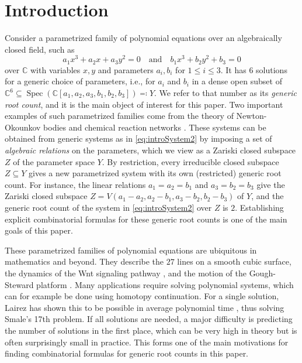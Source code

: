 \documentclass[12pt,reqno,a4paper]{amsart}
\theoremstyle{theoremstyle}
\theoremstyle{examplestyle}
\theoremstyle{algorithmstyle}
\newcommand{\CC}{\mathbb{C}}
\DeclareMathOperator{\Spec}{Spec}
\begin{document}
%

%
\section{Introduction}\label{sec:Introduction}
Consider a parametrized family of polynomial equations over an algebraically closed field, such as
\begin{equation}
  \label{eq:introSystem2}
  a_{1} x^3 +a_{2}x+ a_{3} y^2 = 0 \quad\text{and}\quad b_{1} x^3+b_{2} y^2+b_{3}=0
\end{equation}
over $\CC$ with variables $x,y$ and parameters $a_{i},b_{i}$ for $1\leq{i}\leq{3}$. It has $6$ solutions for a generic choice of parameters, i.e., for $a_{i}$ and $b_{i}$ in a dense open subset of $\mathbb{C}^{6}\subseteq \Spec(\mathbb{C}[a_{1},a_{2},a_{3},b_{1},b_{2},b_{3}])\eqqcolon Y$.  We refer to that number as its \emph{generic root count}, and it is the main object of interest for this paper. Two important examples of such parametrized families come from the theory of Newton-Okounkov bodies \cite{KavehKhovanskii2010,KavehKhovanskii2012} and chemical reaction networks \cite{Dickenstein16}. These systems can be obtained from generic systems as in \cref{eq:introSystem2} by imposing a set of \emph{algebraic relations} on the parameters, which we view as a Zariski closed subspace $Z$ of the parameter space $Y$. By restriction, every irreducible closed subspace $Z\subseteq Y$ gives a new parametrized system with its own (restricted) generic root count. For instance, the linear relations $a_{1}=a_{2}=b_{1}$ and $a_{3}=b_{2}=b_{3}$ give the Zariski closed subspace $Z=V(a_{1}-a_{2},a_{2}-b_{1},a_{3}-b_{2},b_{2}-b_{3})$ of $Y$, and the generic root count of the system in \cref{eq:introSystem2} over $Z$ is $2$. Establishing explicit combinatorial formulas for these generic root counts is one of the main goals of this paper.

These parametrized families of polynomial equations are ubiquitous in mathematics and beyond. They describe the $27$ lines on a smooth cubic surface, the dynamics of the Wnt signaling pathway \cite{GHRS16}, and the motion of the Gough-Steward platform \cite{SW05}. Many applications require solving polynomial systems, which can for example be done using homotopy continuation. For a single solution, Lairez has shown this to be possible in average polynomial time \cite{Lairez17}, thus solving Smale's 17th problem. If all solutions are needed, a major difficulty is predicting the number of solutions in the first place, which can be very high in theory but is often surprisingly small in practice. This forms one of the main motivations for finding combinatorial formulas for generic root counts in this paper.   
\end{document}
